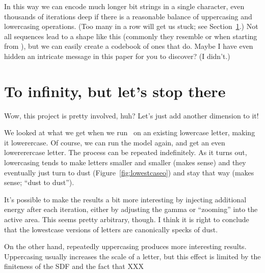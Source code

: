 \documentclass[twocolumn]{article}
\begin{document}
In this way we can encode much longer bit strings in a single
character, even thousands of iterations deep if there is a reasonable
balance of uppercasing and lowercasing operations. (Too many in a row
will get us stuck; see Section~\ref{sec:lowestcase}.) Not all
sequences lead to a shape like this (commonly they resemble
 or  when starting from ),
but we can easily create a codebook of ones that do. Maybe I have even
hidden an intricate message in this paper for you to discover? (I
didn't.)


% 
% 


\section{To infinity, but let's stop there} \label{sec:lowestcase}

Wow, this project is pretty involved, huh? Let's just add another
dimension to it!

We looked at what we get when we run \makelowercase\ on an existing
lowercase letter, making it lowerercase. Of course, we can run the
model again, and get an even lowererercase letter. The process can be
repeated indefinitely. As it turns out, lowercasing tends to make
letters smaller and smaller (makes sense) and they eventually just
turn to dust (Figure~\ref{fig:lowestcaseo}) and stay that way (makes
sense; ``dust to dust'').

It's possible to make the results a bit more interesting by injecting
additional energy after each iteration, either by adjusting the gamma
or ``zooming'' into the active area. This seems pretty arbitrary,
though. I think it is right to conclude that the lowestcase versions
of letters are canonically specks of dust.

On the other hand, repeatedly uppercasing produces more interesting
results. Uppercasing usually increases the scale of a letter, but
this effect is limited by the finiteness of the SDF and the fact
that XXX
\end{document}
